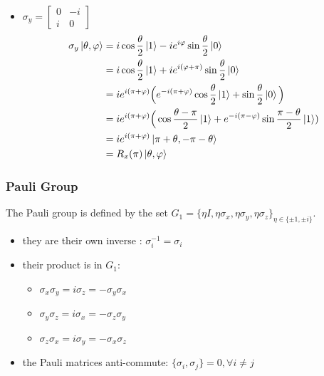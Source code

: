 \documentclass{article}
\begin{document}
\begin{itemize}[label=-]
    \item $\sigma_y = \begin{bmatrix}
        0 & -i \\ i & 0
    \end{bmatrix}$
    \begin{equation}
        \begin{aligned}
            \sigma_y\ket{\theta, \varphi}
                & = i\cos\frac{\theta}{2}\ket{1} - ie^{i\varphi}\sin\frac{\theta}{2}\ket{0} \\
                & = i\cos\frac{\theta}{2}\ket{1} + ie^{i(\varphi+\pi)}\sin\frac{\theta}{2}\ket{0}\\
                & = ie^{i(\pi+\varphi)}\Big(e^{-i(\pi+\varphi)}
                \cos\frac{\theta}{2}\ket{1}+\sin\frac{\theta}{2}\ket{0}\Big) \\
                & = ie^{i(\pi+\varphi)}\Big(\cos\frac{\theta-\pi}{2}
                \ket{1}+e^{-i(\pi-\varphi)}\sin\frac{\pi-\theta}{2}\ket{1}) \\
                & = ie^{i(\pi+\varphi)}\ket{\pi+\theta, -\pi-\theta} \\
                & = R_x(\pi)\ket{\theta, \varphi}
        \end{aligned}
    \end{equation}

\end{itemize}


\subsubsection*{Pauli Group}
The Pauli group is defined by the set $G_1 = \{\eta I, \eta\sigma_x, \eta\sigma_y,
\eta\sigma_z\}_{\eta\in\{\pm 1, \pm i\}}$.
\begin{itemize}
    \item they are their own inverse : $\sigma_i^{-1}=\sigma_i$
    \item their product is in $G_1$:
    \begin{itemize}
        \item $\sigma_x\sigma_y=i\sigma_z=-\sigma_y\sigma_x$
        \item $\sigma_y\sigma_z=i\sigma_x=-\sigma_z\sigma_y$
        \item $\sigma_z\sigma_x=i\sigma_y=-\sigma_x\sigma_z$
    \end{itemize}
    \item the Pauli matrices anti-commute: $\{\sigma_i, \sigma_j\} = 0, \forall i \neq j$
\end{itemize}
\end{document}
